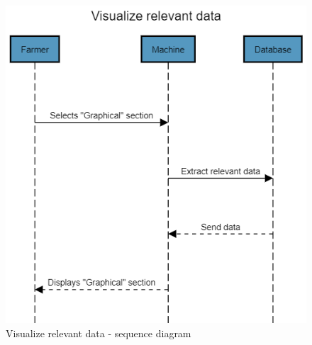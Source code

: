 \begin{figure}[H]
	\centering
    \includegraphics[page=1, width=\textwidth]{Images/Sequence diagrams/SW2 - Visualize relevant data.png}
	\caption{\label{fig:good_practice_seq_diag} Visualize relevant data - sequence diagram}
\end{figure}